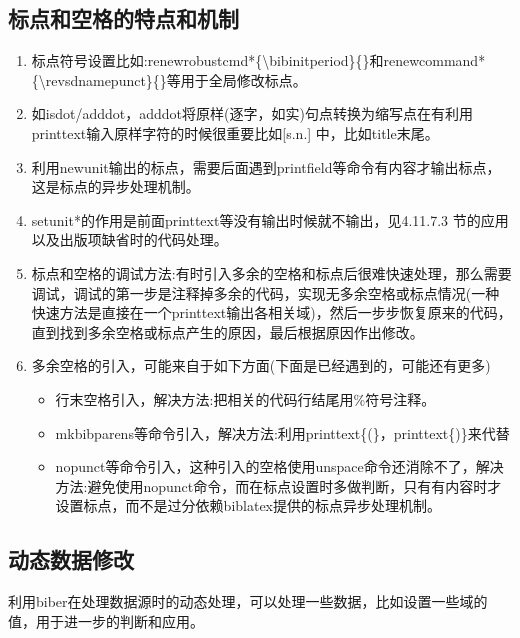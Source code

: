 \subsection{标点和空格的特点和机制}
  \begin{enumerate}
    \item 标点符号设置比如:renewrobustcmd*\{\textbackslash bibinitperiod\}\{\}和renewcommand*\{\textbackslash revsdnamepunct\}\{\}等用于全局修改标点。
    \item 如isdot/adddot，adddot将原样(逐字，如实)句点转换为缩写点在有利用printtext输入原样字符的时候很重要比如[s.n.] 中，比如title末尾。
    \item 利用newunit输出的标点，需要后面遇到printfield等命令有内容才输出标点，这是标点的异步处理机制。
    \item setunit*的作用是前面printtext等没有输出时候就不输出，见4.11.7.3 节的应用以及出版项缺省时的代码处理。
    \item 标点和空格的调试方法:有时引入多余的空格和标点后很难快速处理，那么需要调试，调试的第一步是注释掉多余的代码，实现无多余空格或标点情况(一种快速方法是直接在一个printtext输出各相关域)，然后一步步恢复原来的代码，直到找到多余空格或标点产生的原因，最后根据原因作出修改。
    \item 多余空格的引入，可能来自于如下方面(下面是已经遇到的，可能还有更多)
    \begin{itemize}
    \item 行末空格引入，解决方法:把相关的代码行结尾用\%符号注释。
    \item mkbibparens等命令引入，解决方法:利用printtext\{(\}，printtext\{)\}来代替
    \item nopunct等命令引入，这种引入的空格使用unspace命令还消除不了，解决方法:避免使用nopunct命令，而在标点设置时多做判断，只有有内容时才设置标点，而不是过分依赖biblatex提供的标点异步处理机制。
    \end{itemize}
  \end{enumerate}


\subsection{动态数据修改}
利用biber在处理数据源时的动态处理，可以处理一些数据，比如设置一些域的值，用于进一步的判断和应用。

